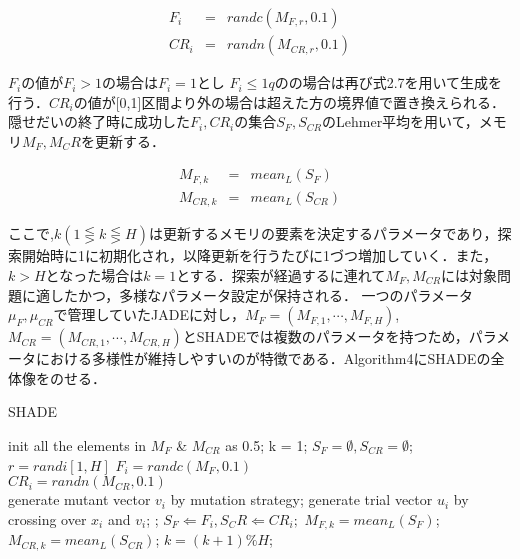 \documentclass[a4paper,11pt,oneside,openany]{jsbook}
\begin{document}
\begin{eqnarray}
  F_i & = & randc(M_{F,r}, 0.1) \\
  CR_i & = & randn(M_{CR,r}, 0.1)
\end{eqnarray}

$F_i$の値が$F_i>1$の場合は$F_i　= 1$とし $F_i\le1qの$の場合は再び式2.7を用いて生成を行う．$CR_i$の値が[0,1]区間より外の場合は超えた方の境界値で置き換えられる．隠せだいの終了時に成功した$F_i,CR_i$の集合$S_F,S_{CR}$のLehmer平均を用いて，メモリ$M_F,M_CR$を更新する．


\begin{eqnarray}
  M_{F,k} & = & mean_L(S_F)\\
  M_{CR,k} & = & mean_L(S_{CR})
\end{eqnarray}

ここで,$k(1\lesseqgtr k \lesseqgtr H)$は更新するメモリの要素を決定するパラメータであり，探索開始時に1に初期化され，以降更新を行うたびに1づつ増加していく．また，$k > H$となった場合は$k = 1$とする．探索が経過するに連れて$M_F,M_{CR}$には対象問題に適したかつ，多様なパラメータ設定が保持される．
一つのパラメータ$\mu _F, \mu _{CR}$で管理していたJADEに対し，$M_F = (M_{F,1},\cdots,M_{F,H})$,$M_{CR}= (M_{CR,1},\cdots,M_{CR,H})$とSHADEでは複数のパラメータを持つため，パラメータにおける多様性が維持しやすいのが特徴である．Algorithm4にSHADEの全体像をのせる．

\begin{algorithm}                      
\caption{SHADE}         
\label{alg:pbnf}                          
\begin{algorithmic}  
\STATE init all the elements in $M _F$ \& $M _{CR}$ as 0.5;
\STATE k = 1;
    \STATE $S_F = \emptyset, S_{CR} = \emptyset$;
        \STATE $r = randi[1,H]$
        \STATE $F_i = randc(M_F, 0.1)$ \\
        \STATE $CR_i = randn(M_{CR}, 0.1)$ \\
        \STATE generate mutant vector {$v_i$} by mutation strategy;
        \STATE generate trial vector {$u_i$} by crossing over {$x_i$} and {$v_i$}; 
    \ENDFOR
            ;
            \STATE $S_F\Leftarrow {F_i}, S_CR \Leftarrow {CR_i};$
        \ENDIF
    \ENDFOR
        \STATE $M_{F,k}  =  mean_L(S_F)$;
        \STATE $M_{CR,k}  =  mean_L(S_{CR})$;
        \STATE $k = (k+1) \% H$;
    \ENDIF
\ENDWHILE
\end{algorithmic}
\end{algorithm}　
\end{document}
